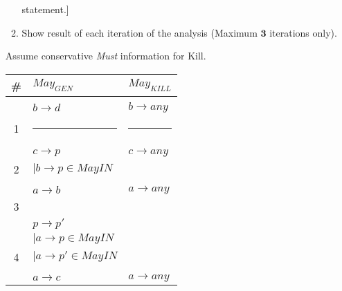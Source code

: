 \documentclass[12pt]{article}
\newcommand{\answer}[1]{{{\blue #1}}}
\begin{document}
\begin{enumerate}
\begin{enumerate}
      statement.] 
  \item Show result of each iteration of the analysis
    (Maximum $\mathbf{3}$ iterations only).
  \end{enumerate}
  Assume conservative {\em Must} information for Kill.
\begin{center}
\end{center}
%
\answer{
\begin{center}
\vspace*{-10mm}\renewcommand{\arraystretch}{1.15}
\hspace*{-25mm}\begin{tabular}{|c||l|l||} \hline
  {\bf \#} & {\bf $May_{GEN}$} & {\bf $May_{KILL}$} \\ \hline \hline
  & & \\
  & $b\rightarrow d$ & $b\rightarrow any$ \\
  1 & \rule{38mm}{0pt}& \rule{38mm}{0pt} \\ \hline
  & & \\
  & $c\rightarrow p$ & $c\rightarrow any$ \\
  2 & $| b\rightarrow p \in MayIN$ &  \\ \hline
  & & \\
  & $a\rightarrow b$ & $a\rightarrow any$ \\
  3 & & \\ \hline
  & $p \rightarrow p'$ & \\
  & $| a\rightarrow p \in MayIN$& \\
  4 & $| a\rightarrow p' \in MayIN$& \\ \hline
  & & \\
  & $a\rightarrow c$ & $a\rightarrow any$ \\

\end{tabular}
\end{center}}
\end{enumerate}
\end{document}
